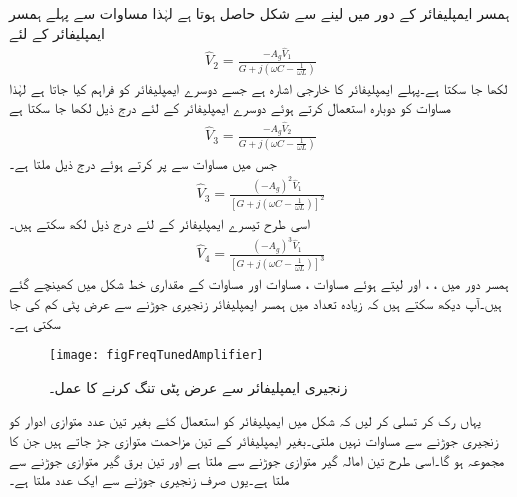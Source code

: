 ہمسر ایمپلیفائر کے دور میں  لینے سے شکل  حاصل ہوتا ہے لہٰذا مساوات  سے پہلے ہمسر ایمپلیفائر کے لئے
\begin{align}\label{مساوات_تعددی_پہلا_ایمپلیفائر}
\hat{V}_2=\frac{-A_g \hat{V}_1}{G+j(\omega C-\frac{1}{\omega L})}
\end{align}
لکھا جا سکتا ہے۔پہلے ایمپلیفائر کا خارجی اشارہ  ہے جسے دوسرے ایمپلیفائر کو فراہم کیا جاتا ہے لہٰذا مساوات  کو دوبارہ استعمال کرتے ہوئے دوسرے ایمپلیفائر کے لئے درج ذیل لکھا جا سکتا ہے
\begin{align*}
\hat{V}_3=\frac{-A_g \hat{V}_2}{G+j(\omega C-\frac{1}{\omega L})}
\end{align*}
جس میں مساوات  سے  پر کرتے ہوئے درج ذیل ملتا ہے۔
\begin{align}\label{مساوات_تعددی_دوسرا_ایمپلیفائر}
\hat{V}_3=\frac{(-A_g)^2 \hat{V}_1}{\left[G+j(\omega C-\frac{1}{\omega L})\right]^2}
\end{align}
اسی طرح تیسرے ایمپلیفائر کے لئے درج ذیل لکھ سکتے ہیں۔
\begin{align}\label{مساوات_تعددی_تیسرا_ایمپلیفائر}
\hat{V}_4=\frac{(-A_g)^3 \hat{V}_1}{\left[G+j(\omega C-\frac{1}{\omega L})\right]^3}
\end{align}
ہمسر دور میں ، ،  اور  لیتے ہوئے مساوات ، مساوات  اور مساوات  کے مقداری خط شکل  میں کھینچے گئے ہیں۔آپ دیکھ سکتے ہیں کہ زیادہ تعداد میں ہمسر ایمپلیفائر زنجیری جوڑنے سے عرض پٹی کم کی جا سکتی ہے۔
\begin{figure}
\centering
\texttt{[image: figFreqTunedAmplifier]}
\caption{زنجیری ایمپلیفائر سے عرض پٹی تنگ کرنے کا عمل۔}
\label{شکل_تعددی_زنجیری_تنگ_پٹی}
\end{figure}
یہاں رک کر تسلی کر لیں کہ شکل  میں ایمپلیفائر کو استعمال کئے بغیر تین عدد متوازی  ادوار کو زنجیری جوڑنے سے  مساوات  نہیں ملتی۔بغیر ایمپلیفائر کے تین مزاحمت متوازی جڑ جاتے ہیں جن کا مجموعہ  ہو گا۔اسی طرح تین امالہ گیر متوازی جوڑنے سے  ملتا ہے اور تین برق گیر متوازی جوڑنے سے  ملتا ہے۔یوں صرف  زنجیری جوڑنے سے ایک عدد  ملتا ہے۔

